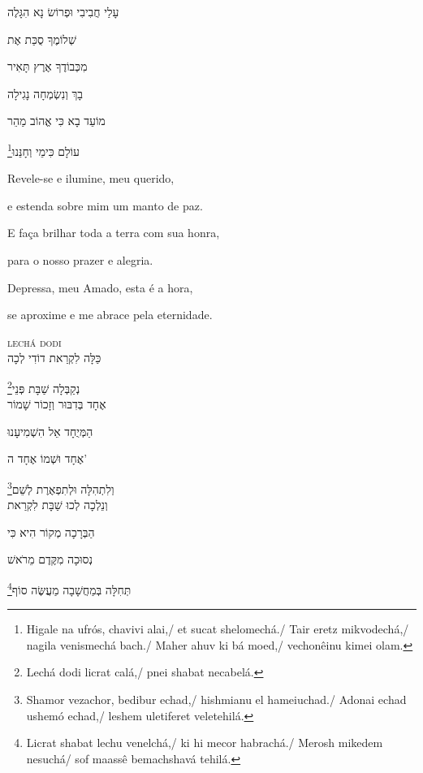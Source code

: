 עָלַי חֲבִיבִי וּפְרוֹשׂ נָא הִגָּלֶה

שְׁלוֹמֶךָ סֻכַּת אֶת

מִכְּבוֹדֶךָ אֶרֶץ תָּאִיר

בָךְ וְנִשְׂמְחָה נָגִילָה

מוֹעֵד בָא כִּי אֱהוֹב מַהֵר

\footnote{Higale na ufrós, chavivi alai,/ et sucat shelomechá./ Tair eretz mikvodechá,/ nagila venismechá bach./ Maher ahuv ki bá moed,/ vechonêinu kimei olam.}עוֹלָם כִּימֵי וְחָנֵּנוּ


\movetooddpage
\raggedright %

\vspace*{1cm}

Revele-se e ilumine, meu querido,

e estenda sobre mim um manto de paz.

E faça brilhar toda a terra com sua honra,

para o nosso prazer e alegria.

Depressa, meu Amado, esta é a hora,

se aproxime e me abrace pela eternidade.



\movetoevenpage
\raggedleft
{}

\vspace*{1cm}

\textsc{lechá dodi}\\[15pt]

כַּלָּה לִקְרַאת דוֹדִי לְכָה

\footnote{Lechá dodi licrat calá,/ pnei shabat necabelá.}נְקַבְּלָה שַׁבָּת פְּנֵי\\[10pt]

אֶחָד בְּדִבּוּר וְזָכוֹר שָׁמוֹר

הַמְּיֻחָד אֵל הִשְׁמִיעָנוּ

אֶחָד וּשְׁמוֹ אֶחָד ה' 

\footnote{Shamor vezachor, bedibur echad,/ hishmianu el hameiuchad./ Adonai echad ushemó echad,/ leshem uletiferet veletehilá.}וְלִתְהִלָּה וּלְתִפְאֶרֶת לְשֵׁם\\[10pt]

וְנֵלְכָה לְכוּ שַׁבָּת לִקְרַאת

הַבְּרָכָה מְקוֹר הִיא כִּי

נְסוּכָה מִקֶּדֶם מֵרֹאשׁ 

\footnote{Licrat shabat lechu venelchá,/ ki hi mecor habrachá./ Merosh mikedem nesuchá/ sof maassê bemachshavá tehilá.}תְּחִלָּה בְּמַחֲשָׁבָה מַעֲשֶּׂה סוֹף\\[10pt]

